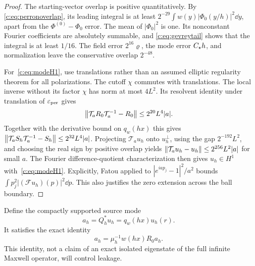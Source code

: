 \begin{proof}
The starting-vector overlap is positive quantitatively. By
\eqref{c:eq:perronoverlap}, its leading integral is at least
$2^{-29}\int w(y)|\Phi_0(y/h)|^2\dd y$, apart from the
$\Phi^{(0)}-\Phi_0$ error. The mean of $|\Phi_0|^2$ is one.
Its nonconstant Fourier coefficients are absolutely summable, and
\eqref{c:eq:gevreytail} shows that the integral is at least $1/16$.
The field error $2^{16}\varrho$, the mode error $C_\star h$, and
normalization leave the conservative overlap $2^{-48}$.

For~\eqref{c:eq:modeH1}, use translations rather than an assumed elliptic
regularity theorem for all polarizations. The cutoff $\chi$ commutes
with translations. The local inverse without its factor $\chi$ has
norm at most $4L^2$. Its resolvent identity under translation of
$\varepsilon_{\rm per}$ gives
\[
 \left\lVert \mathcal T_aR_0\mathcal T_a^{-1}-R_0\right\rVert\le2^{20}L^4|a|.
\]
Together with the derivative bound on $q_w(hx)$ this gives
$\left\lVert \mathcal T_aS_h\mathcal T_a^{-1}-S_h\right\rVert\le2^{32}L^4|a|$. Projecting $\mathcal T_au_h$ onto
$u_h^\perp$, using the gap $2^{-192}L^2$, and choosing the real sign
by positive overlap yields
$\left\lVert \mathcal T_au_h-u_h\right\rVert\le2^{256}L^2|a|$ for small $a$.
The Fourier difference-quotient characterization then gives
$u_h\in H^1$ with~\eqref{c:eq:modeH1}. Explicitly, Fatou applied to
$|e^{iap_j}-1|^2/a^2$ bounds $\int p_j^2|(\mathcal Fu_h)(p)|^2\dd p$.
This also justifies the zero extension across the ball boundary.
\end{proof}

Define the compactly supported source mode
\begin{equation}
 a_h=Q_h^*u_h=q_w(hx)u_h(r).                          \label{c:eq:source-mode}
\end{equation}
It satisfies the exact identity
\begin{equation}
 a_h=\mu_h^{-1}w(hx)R_0a_h.                           \label{c:eq:source-mode-equation}
\end{equation}
This identity, not a claim of an exact isolated eigenstate of the full
infinite Maxwell operator, will control leakage.

